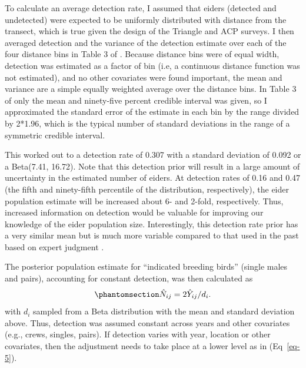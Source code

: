 \documentclass[
  10pt,
  letterpaper,
]{article}
\begin{document}
To calculate an average detection rate, I assumed that eiders (detected
and undetected) were expected to be uniformly distributed with distance
from the transect, which is true given the design of the Triangle and
ACP surveys. I then averaged detection and the variance of the detection
estimate over each of the four distance bins in Table 3 of
. Because distance bins were of equal width,
detection was estimated as a factor of bin (i.e, a continuous distance
function was not estimated), and no other covariates were found
important, the mean and variance are a simple equally weighted average
over the distance bins. In Table 3 of  only the mean
and ninety-five percent credible interval was given, so I approximated
the standard error of the estimate in each bin by the range divided by
2*1.96, which is the typical number of standard deviations in the range
of a symmetric credible interval.

This worked out to a detection rate of 0.307 with a standard deviation
of 0.092 or a Beta(7.41, 16.72). Note that this detection prior will
result in a large amount of uncertainty in the estimated number of
eiders. At detection rates of 0.16 and 0.47 (the fifth and ninety-fifth
percentile of the distribution, respectively), the eider population
estimate will be increased about 6- and 2-fold, respectively. Thus,
increased information on detection would be valuable for improving our
knowledge of the eider population size. Interestingly, this detection
rate prior has a very similar mean but is much more variable compared to
that used in the past based on expert judgment
\citep{dunham2017evaluating}.

The posterior population estimate for ``indicated breeding birds''
(single males and pairs), accounting for constant detection, was then
calculated as
\begin{equation}\phantomsection\label{eq-7}{\hat N_{ij} = 2\hat Y _{ij}/d_{i}.}\end{equation}
with \(d_i\) sampled from a Beta distribution with the mean and standard
deviation above. Thus, detection was assumed constant across years and
other covariates (e.g., crews, singles, pairs). If detection varies with
year, location or other covariates, then the adjustment needs to take
place at a lower level as in (Eq~\ref{eq-5}).
\end{document}
